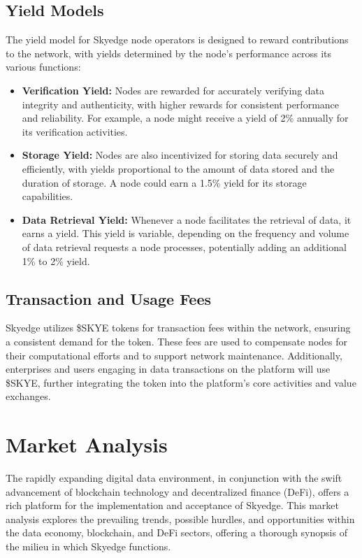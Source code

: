 \documentclass{article}
\begin{document}
\subsection{Yield Models}
The yield model for Skyedge node operators is designed to reward contributions to the network, with yields determined by the node's performance across its various functions:
\begin{itemize}
    \item \textbf{Verification Yield:} Nodes are rewarded for accurately verifying data integrity and authenticity, with higher rewards for consistent performance and reliability. For example, a node might receive a yield of 2\% annually for its verification activities.
    \item \textbf{Storage Yield:} Nodes are also incentivized for storing data securely and efficiently, with yields proportional to the amount of data stored and the duration of storage. A node could earn a 1.5\% yield for its storage capabilities.
    \item \textbf{Data Retrieval Yield:} Whenever a node facilitates the retrieval of data, it earns a yield. This yield is variable, depending on the frequency and volume of data retrieval requests a node processes, potentially adding an additional 1\% to 2\% yield.

\end{itemize}

\subsection{Transaction and Usage Fees}

Skyedge utilizes \$SKYE tokens for transaction fees within the network, ensuring a consistent demand for the token. These fees are used to compensate nodes for their computational efforts and to support network maintenance. Additionally, enterprises and users engaging in data transactions on the platform will use \$SKYE, further integrating the token into the platform's core activities and value exchanges.


\pagebreak

\section{Market Analysis}

The rapidly expanding digital data environment, in conjunction with the swift advancement of blockchain technology and decentralized finance (DeFi), offers a rich platform for the implementation and acceptance of Skyedge. This market analysis explores the prevailing trends, possible hurdles, and opportunities within the data economy, blockchain, and DeFi sectors, offering a thorough synopsis of the milieu in which Skyedge functions. 
\end{document}
